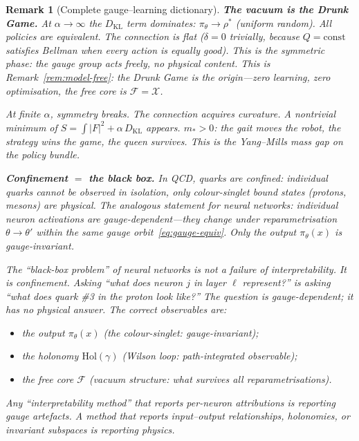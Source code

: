 \documentclass[11pt,a4paper]{article}
\newtheorem{remark}[theorem]{Remark}
\newcommand{\cF}{\mathcal{F}}
\newcommand{\cX}{\mathcal{X}}
\newcommand{\DKL}{D_{\mathrm{KL}}}
\begin{document}
\begin{remark}[Complete gauge--learning dictionary]
\medskip\noindent
\textbf{The vacuum is the Drunk Game.}\;
At $\alpha \to \infty$
the $\DKL$ term dominates:
$\pi_\theta \to \rho^*$ (uniform random).
All policies are equivalent.
The connection is flat ($\delta = 0$ trivially,
because $Q = \mathrm{const}$ satisfies Bellman
when every action is equally good).
This is the \emph{symmetric phase}:
the gauge group acts freely,
no physical content.
This is Remark~\ref{rem:model-free}:
the Drunk Game is the origin---zero learning,
zero optimisation, the free core is $\cF = \cX$.

At finite $\alpha$, symmetry breaks.
The connection acquires curvature.
A nontrivial minimum of
$S = \int|F|^2 + \alpha\,\DKL$ appears.
$m_* > 0$: the gait moves the robot,
the strategy wins the game,
the queen survives.
This is the Yang--Mills mass gap on
the policy bundle.

\medskip\noindent
\textbf{Confinement $=$ the black box.}\;
In QCD, quarks are \emph{confined}:
individual quarks cannot be observed in isolation,
only colour-singlet bound states
(protons, mesons) are physical.
The analogous statement for neural networks:
individual neuron activations are
\emph{gauge-dependent}---they change
under reparametrisation
$\theta \to \theta'$ within the same
gauge orbit~\eqref{eq:gauge-equiv}.
Only the \emph{output}
$\pi_\theta(x)$ is gauge-invariant.

The ``black-box problem'' of neural networks
is not a failure of interpretability.
It is \emph{confinement}.
Asking ``what does neuron $j$ in layer $\ell$
represent?''
is asking ``what does quark \#3 in the proton
look like?''
The question is gauge-dependent;
it has no physical answer.
The correct observables are:
\begin{itemize}[nosep]
\item the output $\pi_\theta(x)$
  (the colour-singlet: gauge-invariant);
\item the holonomy $\mathrm{Hol}(\gamma)$
  (Wilson loop: path-integrated observable);
\item the free core $\cF$
  (vacuum structure:
  what survives all reparametrisations).
\end{itemize}
Any ``interpretability method'' that reports
per-neuron attributions is reporting gauge artefacts.
A method that reports input--output relationships,
holonomies, or invariant subspaces is reporting
physics.
\end{remark}
\end{document}
